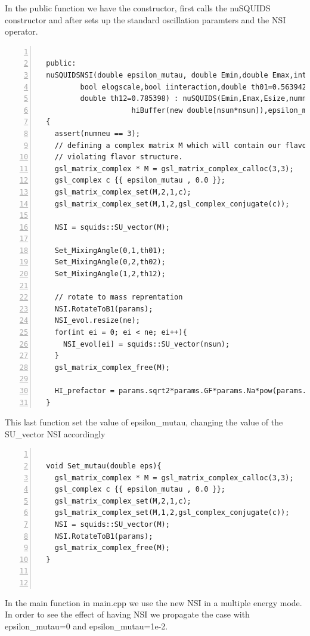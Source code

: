 In the public function we have the constructor, first calls the
nuSQUIDS constructor and after sets up the standard oscillation
paramters and the NSI operator.  
\begin{lstlisting}[frame=leftline, numbers =
  left,breaklines=true,label = ex:sin1,firstnumber=last]

  public:
  nuSQUIDSNSI(double epsilon_mutau, double Emin,double Emax,int Esize,int numneu, NeutrinoType NT,
	      bool elogscale,bool iinteraction,double th01=0.563942, double th02=0.154085, 
	      double th12=0.785398) : nuSQUIDS(Emin,Emax,Esize,numneu,NT,elogscale,iinteraction),
				      hiBuffer(new double[nsun*nsun]),epsilon_mutau(epsilon_mutau)
  {
    assert(numneu == 3);
    // defining a complex matrix M which will contain our flavor
    // violating flavor structure.
    gsl_matrix_complex * M = gsl_matrix_complex_calloc(3,3);
    gsl_complex c {{ epsilon_mutau , 0.0 }};
    gsl_matrix_complex_set(M,2,1,c);
    gsl_matrix_complex_set(M,1,2,gsl_complex_conjugate(c));
    
    NSI = squids::SU_vector(M);
    
    Set_MixingAngle(0,1,th01);
    Set_MixingAngle(0,2,th02);
    Set_MixingAngle(1,2,th12);
    
    // rotate to mass reprentation
    NSI.RotateToB1(params);
    NSI_evol.resize(ne);
    for(int ei = 0; ei < ne; ei++){
      NSI_evol[ei] = squids::SU_vector(nsun);
    }
    gsl_matrix_complex_free(M);
    
    HI_prefactor = params.sqrt2*params.GF*params.Na*pow(params.cm,-3);
  }

\end{lstlisting}

This last function set the value of {\ttf epsilon\_mutau}, changing the
value of the {\ttf SU\_vector NSI} accordingly 

\begin{lstlisting}[frame=leftline, numbers =
  left,breaklines=true,label = ex:sin1,firstnumber=last]
  
  void Set_mutau(double eps){
    gsl_matrix_complex * M = gsl_matrix_complex_calloc(3,3);
    gsl_complex c {{ epsilon_mutau , 0.0 }};
    gsl_matrix_complex_set(M,2,1,c);
    gsl_matrix_complex_set(M,1,2,gsl_complex_conjugate(c));
    NSI = squids::SU_vector(M);    
    NSI.RotateToB1(params);
    gsl_matrix_complex_free(M);
  }
 
  
\end{lstlisting}


In the main function in {\ttf main.cpp} we use the new NSI in a
multiple energy mode. In order
to see the effect of having NSI we propagate the case with {\ttf
  epsilon\_mutau=0} and {\ttf epsilon\_mutau=1e-2}.


